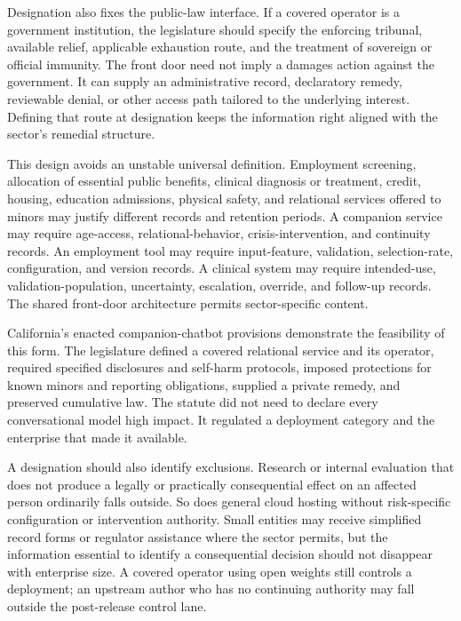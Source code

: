 Designation also fixes the public-law interface. If a covered operator is a government institution, the legislature should specify the enforcing tribunal, available relief, applicable exhaustion route, and the treatment of sovereign or official immunity. The front door need not imply a damages action against the government. It can supply an administrative record, declaratory remedy, reviewable denial, or other access path tailored to the underlying interest. Defining that route at designation keeps the information right aligned with the sector's remedial structure.

This design avoids an unstable universal definition. Employment screening, allocation of essential public benefits, clinical diagnosis or treatment, credit, housing, education admissions, physical safety, and relational services offered to minors may justify different records and retention periods. A companion service may require age-access, relational-behavior, crisis-intervention, and continuity records. An employment tool may require input-feature, validation, selection-rate, configuration, and version records. A clinical system may require intended-use, validation-population, uncertainty, escalation, override, and follow-up records. The shared front-door architecture permits sector-specific content.

California's enacted companion-chatbot provisions demonstrate the feasibility of this form. The legislature defined a covered relational service and its operator, required specified disclosures and self-harm protocols, imposed protections for known minors and reporting obligations, supplied a private remedy, and preserved cumulative law. The statute did not need to declare every conversational model high impact. It regulated a deployment category and the enterprise that made it available.

A designation should also identify exclusions. Research or internal evaluation that does not produce a legally or practically consequential effect on an affected person ordinarily falls outside. So does general cloud hosting without risk-specific configuration or intervention authority. Small entities may receive simplified record forms or regulator assistance where the sector permits, but the information essential to identify a consequential decision should not disappear with enterprise size. A covered operator using open weights still controls a deployment; an upstream author who has no continuing authority may fall outside the post-release control lane.

